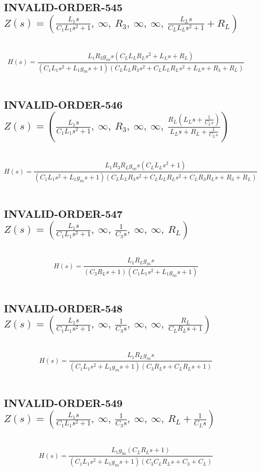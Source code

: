 \documentclass{article}
\begin{document}
\subsection{INVALID-ORDER-545 $Z(s) = \left( \frac{L_{1} s}{C_{1} L_{1} s^{2} + 1}, \  \infty, \  R_{3}, \  \infty, \  \infty, \  \frac{L_{L} s}{C_{L} L_{L} s^{2} + 1} + R_{L}\right)$ } \ 
\textbf{\[H(s) = \frac{L_{1} R_{3} g_{m} s \left(C_{L} L_{L} R_{L} s^{2} + L_{L} s + R_{L}\right)}{\left(C_{1} L_{1} s^{2} + L_{1} g_{m} s + 1\right) \left(C_{L} L_{L} R_{3} s^{2} + C_{L} L_{L} R_{L} s^{2} + L_{L} s + R_{3} + R_{L}\right)}\] } \ 
\subsection{INVALID-ORDER-546 $Z(s) = \left( \frac{L_{1} s}{C_{1} L_{1} s^{2} + 1}, \  \infty, \  R_{3}, \  \infty, \  \infty, \  \frac{R_{L} \left(L_{L} s + \frac{1}{C_{L} s}\right)}{L_{L} s + R_{L} + \frac{1}{C_{L} s}}\right)$ } \ 
\textbf{\[H(s) = \frac{L_{1} R_{3} R_{L} g_{m} s \left(C_{L} L_{L} s^{2} + 1\right)}{\left(C_{1} L_{1} s^{2} + L_{1} g_{m} s + 1\right) \left(C_{L} L_{L} R_{3} s^{2} + C_{L} L_{L} R_{L} s^{2} + C_{L} R_{3} R_{L} s + R_{3} + R_{L}\right)}\] } \ 
\subsection{INVALID-ORDER-547 $Z(s) = \left( \frac{L_{1} s}{C_{1} L_{1} s^{2} + 1}, \  \infty, \  \frac{1}{C_{3} s}, \  \infty, \  \infty, \  R_{L}\right)$ } \ 
\textbf{\[H(s) = \frac{L_{1} R_{L} g_{m} s}{\left(C_{3} R_{L} s + 1\right) \left(C_{1} L_{1} s^{2} + L_{1} g_{m} s + 1\right)}\] } \ 
\subsection{INVALID-ORDER-548 $Z(s) = \left( \frac{L_{1} s}{C_{1} L_{1} s^{2} + 1}, \  \infty, \  \frac{1}{C_{3} s}, \  \infty, \  \infty, \  \frac{R_{L}}{C_{L} R_{L} s + 1}\right)$ } \ 
\textbf{\[H(s) = \frac{L_{1} R_{L} g_{m} s}{\left(C_{1} L_{1} s^{2} + L_{1} g_{m} s + 1\right) \left(C_{3} R_{L} s + C_{L} R_{L} s + 1\right)}\] } \ 
\subsection{INVALID-ORDER-549 $Z(s) = \left( \frac{L_{1} s}{C_{1} L_{1} s^{2} + 1}, \  \infty, \  \frac{1}{C_{3} s}, \  \infty, \  \infty, \  R_{L} + \frac{1}{C_{L} s}\right)$ } \ 
\textbf{\[H(s) = \frac{L_{1} g_{m} \left(C_{L} R_{L} s + 1\right)}{\left(C_{1} L_{1} s^{2} + L_{1} g_{m} s + 1\right) \left(C_{3} C_{L} R_{L} s + C_{3} + C_{L}\right)}\] } \ 
\end{document}
